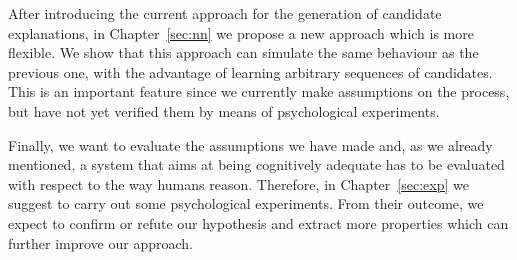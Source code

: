 After introducing the current approach for the generation of candidate explanations, in Chapter~\ref{sec:nn} we propose a new approach which is more flexible. We show that this approach can simulate the same behaviour as the previous one, with the advantage of learning arbitrary sequences of candidates. This is an important feature since we currently make assumptions on the process, but have not yet verified them by means of psychological experiments.

Finally, we want to evaluate the assumptions we have made and, as we already mentioned, a system that aims at being cognitively adequate has to be evaluated with respect to the way humans reason. Therefore, in Chapter~\ref{sec:exp} we suggest to carry out some psychological experiments. From their outcome, we expect to confirm or refute our hypothesis and extract more properties which can further improve our approach. 

